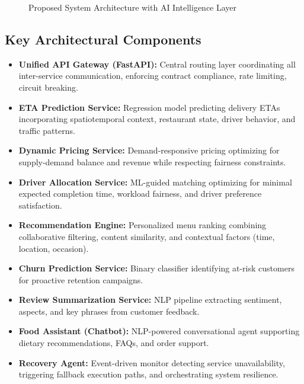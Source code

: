 \documentclass[12pt,a4paper]{report}
\begin{document}
\begin{figure}[H]
\centering
{}
\caption{Proposed System Architecture with AI Intelligence Layer}
\end{figure}

\subsection{Key Architectural Components}

\begin{itemize}
    \item \textbf{Unified API Gateway (FastAPI):} Central routing layer coordinating all inter-service communication, enforcing contract compliance, rate limiting, circuit breaking.
    
    \item \textbf{ETA Prediction Service:} Regression model predicting delivery ETAs incorporating spatiotemporal context, restaurant state, driver behavior, and traffic patterns.
    
    \item \textbf{Dynamic Pricing Service:} Demand-responsive pricing optimizing for supply-demand balance and revenue while respecting fairness constraints.
    
    \item \textbf{Driver Allocation Service:} ML-guided matching optimizing for minimal expected completion time, workload fairness, and driver preference satisfaction.
    
    \item \textbf{Recommendation Engine:} Personalized menu ranking combining collaborative filtering, content similarity, and contextual factors (time, location, occasion).
    
    \item \textbf{Churn Prediction Service:} Binary classifier identifying at-risk customers for proactive retention campaigns.
    
    \item \textbf{Review Summarization Service:} NLP pipeline extracting sentiment, aspects, and key phrases from customer feedback.
    
    \item \textbf{Food Assistant (Chatbot):} NLP-powered conversational agent supporting dietary recommendations, FAQs, and order support.
    
    \item \textbf{Recovery Agent:} Event-driven monitor detecting service unavailability, triggering fallback execution paths, and orchestrating system resilience.
\end{itemize}
\end{document}
